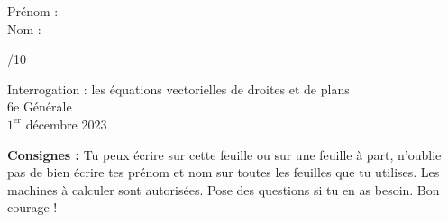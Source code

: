 


	\begin{minipage}[t]{.5\textwidth}
		{\large Prénom :\\
		Nom :}
	\end{minipage}%
	\begin{minipage}[t]{.5\textwidth}
		\begin{flushright}
			{\Large /10}
		\end{flushright}
	\end{minipage}

	\vspace{3em}
	\begin{center}
			{\Large Interrogation : les équations vectorielles de droites et de plans}\\
			{\large 6e Générale}\\
			$1^{\text{er}}$ décembre 2023
	\end{center}
	
	\vspace{3em}
	
	\textbf{Consignes :} Tu peux écrire sur cette feuille ou sur une feuille à part, n'oublie pas de bien écrire tes prénom et nom sur toutes les feuilles que tu utilises. Les machines à calculer sont autorisées. Pose des questions si tu en as besoin. Bon courage !
	
	\vspace{2em}
	
